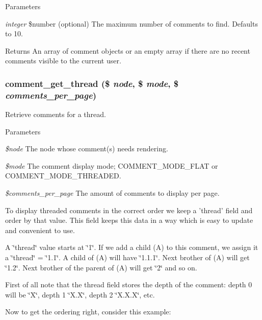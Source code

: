 \begin{DoxyParams}{Parameters}
\item[{\em integer}]\$number (optional) The maximum number of comments to find. Defaults to 10.\end{DoxyParams}
\begin{DoxyReturn}{Returns}
An array of comment objects or an empty array if there are no recent comments visible to the current user. 
\end{DoxyReturn}
\hypertarget{comment_8module_a7a7849475c35ea0266611552e0feba9c}{
\subsubsection[{comment\_\-get\_\-thread}]{\setlength{\rightskip}{0pt plus 5cm}comment\_\-get\_\-thread (\$ {\em node}, \/  \$ {\em mode}, \/  \$ {\em comments\_\-per\_\-page})}}
\label{comment_8module_a7a7849475c35ea0266611552e0feba9c}
Retrieve comments for a thread.


\begin{DoxyParams}{Parameters}
\item[{\em \$node}]The node whose comment(s) needs rendering. \item[{\em \$mode}]The comment display mode; COMMENT\_\-MODE\_\-FLAT or COMMENT\_\-MODE\_\-THREADED. \item[{\em \$comments\_\-per\_\-page}]The amount of comments to display per page.\end{DoxyParams}
To display threaded comments in the correct order we keep a 'thread' field and order by that value. This field keeps this data in a way which is easy to update and convenient to use.

A \char`\"{}thread\char`\"{} value starts at \char`\"{}1\char`\"{}. If we add a child (A) to this comment, we assign it a \char`\"{}thread\char`\"{} = \char`\"{}1.1\char`\"{}. A child of (A) will have \char`\"{}1.1.1\char`\"{}. Next brother of (A) will get \char`\"{}1.2\char`\"{}. Next brother of the parent of (A) will get \char`\"{}2\char`\"{} and so on.

First of all note that the thread field stores the depth of the comment: depth 0 will be \char`\"{}X\char`\"{}, depth 1 \char`\"{}X.X\char`\"{}, depth 2 \char`\"{}X.X.X\char`\"{}, etc.

Now to get the ordering right, consider this example:

